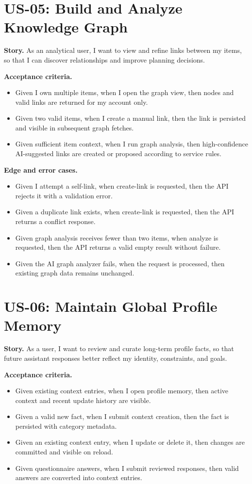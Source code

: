 \section{US-05: Build and Analyze Knowledge Graph}

\textbf{Story.} As an analytical user, I want to view and refine links between my items, so that I can discover relationships and improve planning decisions.

\textbf{Acceptance criteria.}
\begin{itemize}
  \item Given I own multiple items, when I open the graph view, then nodes and valid links are returned for my account only.
  \item Given two valid items, when I create a manual link, then the link is persisted and visible in subsequent graph fetches.
  \item Given sufficient item context, when I run graph analysis, then high-confidence AI-suggested links are created or proposed according to service rules.
\end{itemize}

\textbf{Edge and error cases.}
\begin{itemize}
  \item Given I attempt a self-link, when create-link is requested, then the API rejects it with a validation error.
  \item Given a duplicate link exists, when create-link is requested, then the API returns a conflict response.
  \item Given graph analysis receives fewer than two items, when analyze is requested, then the API returns a valid empty result without failure.
  \item Given the AI graph analyzer fails, when the request is processed, then existing graph data remains unchanged.
\end{itemize}

\section{US-06: Maintain Global Profile Memory}

\textbf{Story.} As a user, I want to review and curate long-term profile facts, so that future assistant responses better reflect my identity, constraints, and goals.

\textbf{Acceptance criteria.}
\begin{itemize}
  \item Given existing context entries, when I open profile memory, then active context and recent update history are visible.
  \item Given a valid new fact, when I submit context creation, then the fact is persisted with category metadata.
  \item Given an existing context entry, when I update or delete it, then changes are committed and visible on reload.
  \item Given questionnaire answers, when I submit reviewed responses, then valid answers are converted into context entries.
\end{itemize}

